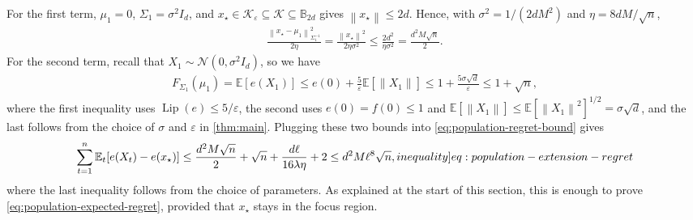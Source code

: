 \documentclass[12pt,cleveref]{jmlr}
\newcommand{\ineqlabel}[1]{\label[inequality]{#1}}
\newcommand{\E}{\mathbb E}
\newcommand{\K}{\mathcal K}
\newcommand{\N}{\mathcal N}
\newcommand{\Lip}{\operatorname{Lip}}
\newcommand{\1}{\mathbf 1}
\newcommand{\eps}{\varepsilon}
\newcommand{\norm}[1]{\left\lVert #1\right\rVert}
\newcommand{\normm}[2]{\left\lVert #1\right\rVert_{#2}}
\begin{document}
For the first term, $\mu_1=0$, $\Sigma_1=\sigma^2I_d$, and $x_\star\in\K_\eps\subseteq\K\subseteq\mathbb B_{2d}$ gives $\norm{x_\star}\leq2d$.
Hence, with $\sigma^2=1/(2dM^2)$ and $\eta=8dM/\sqrt n$,
\begin{align}
    \frac{\normm{x_\star-\mu_1}{\Sigma_1^{-1}}^2}{2\eta}
    =\frac{\norm{x_\star}^2}{2\eta\sigma^2}
    \leq\frac{2d^2}{\eta\sigma^2}
    =\frac{d^2M\sqrt n}{2}.
\end{align}
For the second term, recall that $X_1\sim\N(0,\sigma^2I_d)$, so we have
\begin{align}
    F_{\Sigma_1}(\mu_1)
    =\E[e(X_1)]
    \leq e(0)+\frac5\eps\E[\norm{X_1}]
    \leq1+\frac{5\sigma\sqrt d}{\eps}
    \leq1+\sqrt n,
\end{align}
where the first inequality uses $\Lip(e)\leq5/\eps$, the second uses $e(0)=f(0)\leq1$ and $\E[\norm{X_1}]\leq\E[\norm{X_1}^2]^{1/2}=\sigma\sqrt d$, and the last follows from the choice of $\sigma$ and $\eps$ in \cref{thm:main}.
Plugging these two bounds into \cref{eq:population-regret-bound} gives
\begin{align}
    \sum_{t=1}^n\E_t[e(X_t)-e(x_\star)]
    \leq\frac{d^2M\sqrt n}{2}+\sqrt n+\frac{d\ell}{16\lambda\eta}+2
    \leq d^2M\ell^8\sqrt n,
    \ineqlabel{eq:population-extension-regret}
\end{align}
where the last inequality follows from the choice of parameters.
As explained at the start of this section, this is enough to prove \cref{eq:population-expected-regret}, provided that $x_\star$ stays in the focus region.
\end{document}
